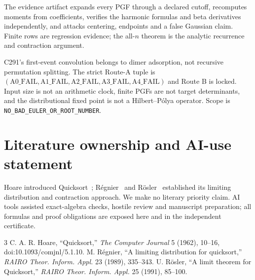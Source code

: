 \documentclass[10pt]{article}
\begin{document}
The evidence artifact expands every PGF through a declared cutoff,
recomputes moments from coefficients, verifies the harmonic formulas and
beta derivatives independently, and attacks centering, endpoints and a false
Gaussian claim.  Finite rows are regression evidence; the all-$n$ theorem is
the analytic recurrence and contraction argument.

C291's first-event convolution belongs to dimer adsorption, not recursive
permutation splitting.  The strict Route-A tuple is
$(\mathrm{A0\_FAIL},\mathrm{A1\_FAIL},\mathrm{A2\_FAIL},
\mathrm{A3\_FAIL},\mathrm{A4\_FAIL})$ and Route B is locked.  Input size is
not an arithmetic clock, finite PGFs are not target determinants, and the
distributional fixed point is not a Hilbert--P\'olya operator.  Scope is
\texttt{NO\_BAD\_EULER\_OR\_ROOT\_NUMBER}.
\fi

\section*{Literature ownership and AI-use statement}
Hoare introduced Quicksort~\cite{Hoare}; R\'egnier~\cite{Regnier} and
R\"osler~\cite{Rosler} established its limiting distribution and contraction
approach.  We make no literary priority claim.
AI tools assisted exact-algebra checks, hostile review and manuscript
preparation; all formulas and proof obligations are exposed here and in the
independent certificate.

\begin{thebibliography}{3}
 C. A. R. Hoare, ``Quicksort,'' \emph{The Computer Journal}
5 (1962), 10--16, doi:10.1093/comjnl/5.1.10.
 M. R\'egnier, ``A limiting distribution for quicksort,''
\emph{RAIRO Theor. Inform. Appl.} 23 (1989), 335--343.
 U. R\"osler, ``A limit theorem for Quicksort,''
\emph{RAIRO Theor. Inform. Appl.} 25 (1991), 85--100.
\end{thebibliography}
\end{document}
